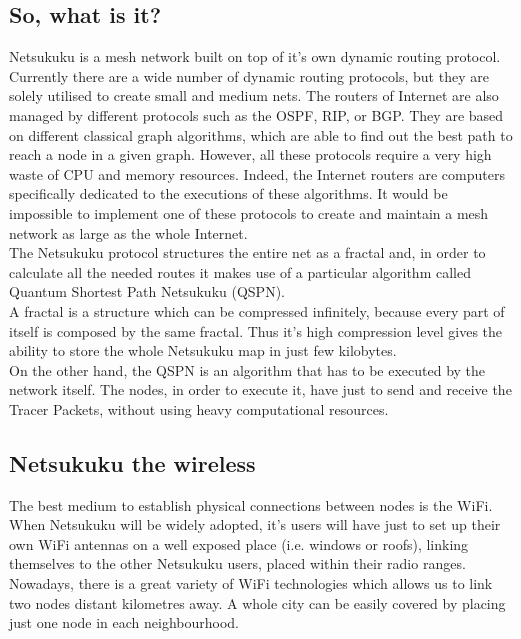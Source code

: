 \documentclass[a4paper]{article}
\begin{document}
\subsection{So, what is it?}

Netsukuku is a mesh network built on top of it's own dynamic routing protocol.\\

Currently there are a wide number of dynamic routing protocols, but they
are solely utilised to create small and medium nets.
The routers of Internet are also managed by different protocols such as the
OSPF, RIP, or BGP. They are based on different classical graph
algorithms, which are able to find out the best path to reach a node in a
given graph. However, all these protocols require a very high waste of CPU and
memory resources. Indeed, the Internet routers are computers specifically
dedicated to the executions of these algorithms. It would be impossible to
implement one of these protocols to create and maintain a mesh network as large
as the whole Internet.\\

The Netsukuku protocol structures the entire net as a
fractal\cite{ntktopology} and, in order to calculate all the needed routes it
makes use of a particular algorithm called Quantum Shortest Path Netsukuku
(QSPN)\cite{qspndoc}.\\

A fractal is a structure which can be compressed infinitely, because every
part of itself is composed by the same fractal. Thus it's high compression
level gives the ability to store the whole Netsukuku map in just few
kilobytes.\\

On the other hand, the QSPN is an algorithm that has to be executed by the
network itself. The nodes, in order to execute it, have just to send and
receive the Tracer Packets, without using heavy computational resources.

\subsection{Netsukuku the wireless}

The best medium to establish physical connections between nodes is the WiFi.
When Netsukuku will be widely adopted, it's users will have just to set up their
own WiFi antennas on a well exposed place (i.e. windows or roofs), linking
themselves to the other Netsukuku users, placed within their radio ranges.
Nowadays, there is a great variety of WiFi technologies which allows us to link
two nodes distant kilometres away. A whole city can be easily covered by
placing just one node in each neighbourhood.\\
\end{document}
